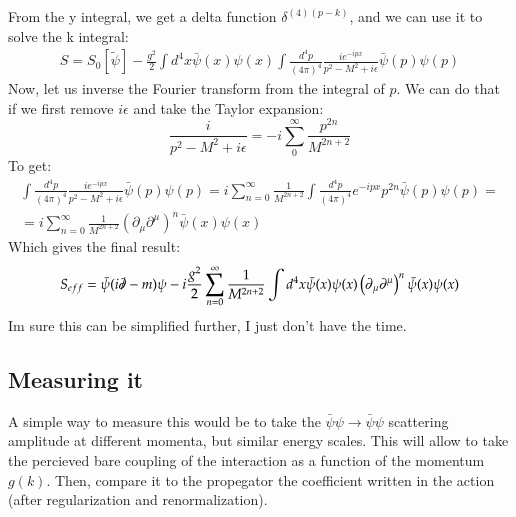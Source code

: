 \documentclass{article}
\begin{document}
From the y integral, we get a delta function $\delta^{(4)(p-k)}$, and we can use it to solve the k integral:
\begin{equation}
\begin{gathered}
    S = S_0[\tilde{\psi}] - \frac{g^2}{2}\int d^4x\bar{\psi}(x)\psi(x) \int \frac{d^4p}{(4\pi)^4} \frac{ie^{-ipx}}{p^2 - M^2 + i\epsilon}\bar{\psi}(p)\psi(p)
\end{gathered}
\end{equation}
Now, let us inverse the Fourier transform from the integral of $p$. We can do that if we first remove $i\epsilon$ and take the Taylor expansion:
\begin{equation}
    \frac{i}{p^2 - M^2 + i\epsilon} = -i \sum_0^\infty \frac{p^{2n}}{M^{2n+2}}
\end{equation}
To get:
\begin{equation}
\begin{gathered}
    \int \frac{d^4p}{(4\pi)^4} \frac{ie^{-ipx}}{p^2 - M^2 + i\epsilon}\bar{\psi}(p)\psi(p) = i\sum_{n=0}^\infty \frac{1}{M^{2n+2}} \int \frac{d^4p}{(4\pi)^4} e^{-ipx} p^{2n}\bar{\psi}(p)\psi(p) = \\ =
    i\sum_{n=0}^\infty \frac{1}{M^{2n+2}} \left(\partial_\mu\partial^\mu\right)^n \bar{\psi}(x)\psi(x)
\end{gathered}
\end{equation}
Which gives the final result:
\begin{equation}
    S_{eff} = \bar{\psi}(i\slashed{\partial} - m)\psi - i\frac{g^2}{2}\sum_{n=0}^\infty \frac{1}{M^{2n+2}} \int d^4x \bar{\psi}(x)\psi(x)\left(\partial_\mu\partial^\mu\right)^n\bar{\psi}(x)\psi(x)
\end{equation}
Im sure this can be simplified further, I just don't have the time.
\subsection{Measuring it}
A simple way to measure this would be to take the $\bar{\psi}\psi \rightarrow \bar{\psi}\psi$ scattering amplitude at different momenta, but similar energy scales. This will allow to take the percieved bare coupling of the interaction as a function of the momentum $g(k)$. Then, compare it to the propegator the coefficient written in the action (after regularization and renormalization).
\end{document}
